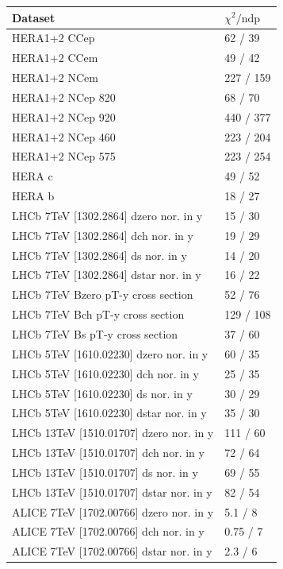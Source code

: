 \documentclass[12pt]{article}
\begin{document}
\begin{table}
\renewcommand*{\arraystretch}{1.12}
    \centering
\begin{tabular}{ll}
    Dataset & $\chi^2/\textrm{ndp}$ \\
    \hline
    HERA1+2 CCep & 62 / 39  \\ 
    HERA1+2 CCem & 49 / 42  \\ 
    HERA1+2 NCem & 227 / 159  \\ 
    HERA1+2 NCep 820 & 68 / 70  \\ 
    HERA1+2 NCep 920 & 440 / 377  \\ 
    HERA1+2 NCep 460 & 223 / 204  \\ 
    HERA1+2 NCep 575 & 223 / 254  \\ 
    HERA c & 49 / 52  \\ 
    HERA b & 18 / 27  \\ 
    LHCb 7TeV [1302.2864] dzero nor. in y & 15 / 30  \\ 
    LHCb 7TeV [1302.2864] dch nor. in y & 19 / 29  \\ 
    LHCb 7TeV [1302.2864] ds nor. in y & 14 / 20  \\ 
    LHCb 7TeV [1302.2864] dstar nor. in y & 16 / 22  \\ 
    LHCb 7TeV Bzero pT-y cross section & 52 / 76  \\ 
    LHCb 7TeV Bch pT-y cross section & 129 / 108  \\ 
    LHCb 7TeV Bs pT-y cross section & 37 / 60  \\ 
    LHCb 5TeV [1610.02230] dzero nor. in y & 60 / 35  \\ 
    LHCb 5TeV [1610.02230] dch nor. in y & 25 / 35  \\ 
    LHCb 5TeV [1610.02230] ds nor. in y & 30 / 29  \\ 
    LHCb 5TeV [1610.02230] dstar nor. in y & 35 / 30  \\ 
    LHCb 13TeV [1510.01707] dzero nor. in y & 111 / 60  \\ 
    LHCb 13TeV [1510.01707] dch nor. in y & 72 / 64  \\ 
    LHCb 13TeV [1510.01707] ds nor. in y & 69 / 55  \\ 
    LHCb 13TeV [1510.01707] dstar nor. in y & 82 / 54  \\ 
    ALICE 7TeV [1702.00766] dzero nor. in y & 5.1 / 8  \\ 
    ALICE 7TeV [1702.00766] dch nor. in y & 0.75 / 7  \\ 
    ALICE 7TeV [1702.00766] dstar nor. in y & 2.3 / 6  \\ 

\end{tabular}
\end{table}
\end{document}
